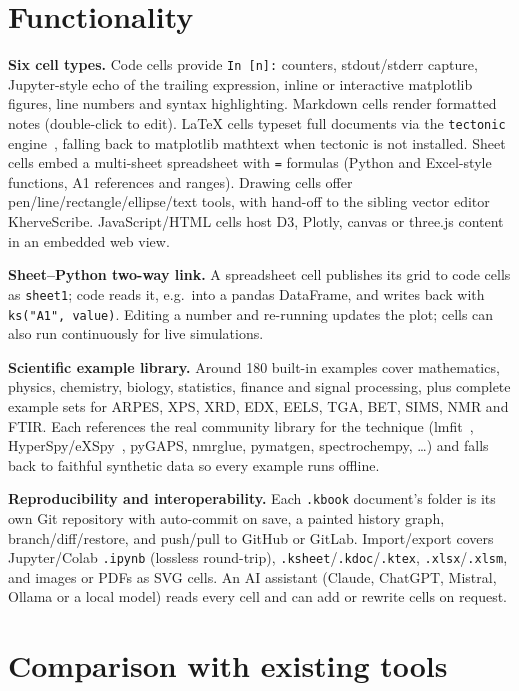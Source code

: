 \documentclass[11pt,a4paper]{article}
\begin{document}
\section{Functionality}

\textbf{Six cell types.} Code cells provide \texttt{In [n]:} counters, stdout/stderr capture, Jupyter-style echo of the trailing expression, inline or interactive matplotlib figures, line numbers and syntax highlighting. Markdown cells render formatted notes (double-click to edit). LaTeX cells typeset full documents via the \texttt{tectonic} engine~\cite{tectonic}, falling back to matplotlib mathtext when tectonic is not installed. Sheet cells embed a multi-sheet spreadsheet with \texttt{=} formulas (Python and Excel-style functions, A1 references and ranges). Drawing cells offer pen/line/rectangle/ellipse/text tools, with hand-off to the sibling vector editor KherveScribe. JavaScript/HTML cells host D3, Plotly, canvas or three.js content in an embedded web view.

\textbf{Sheet--Python two-way link.} A spreadsheet cell publishes its grid to code cells as \texttt{sheet1}; code reads it, e.g.\ into a pandas DataFrame, and writes back with \texttt{ks("A1", value)}. Editing a number and re-running updates the plot; cells can also run continuously for live simulations.

\textbf{Scientific example library.} Around 180 built-in examples cover mathematics, physics, chemistry, biology, statistics, finance and signal processing, plus complete example sets for ARPES, XPS, XRD, EDX, EELS, TGA, BET, SIMS, NMR and FTIR. Each references the real community library for the technique (lmfit~\cite{lmfit}, HyperSpy/eXSpy~\cite{hyperspy}, pyGAPS, nmrglue, pymatgen, spectrochempy, \ldots) and falls back to faithful synthetic data so every example runs offline.

\textbf{Reproducibility and interoperability.} Each \texttt{.kbook} document's folder is its own Git repository with auto-commit on save, a painted history graph, branch/diff/restore, and push/pull to GitHub or GitLab. Import/export covers Jupyter/Colab \texttt{.ipynb} (lossless round-trip), \texttt{.ksheet}/\texttt{.kdoc}/\texttt{.ktex}, \texttt{.xlsx}/\texttt{.xlsm}, and images or PDFs as SVG cells. An AI assistant (Claude, ChatGPT, Mistral, Ollama or a local model) reads every cell and can add or rewrite cells on request.

\section{Comparison with existing tools}
\end{document}
